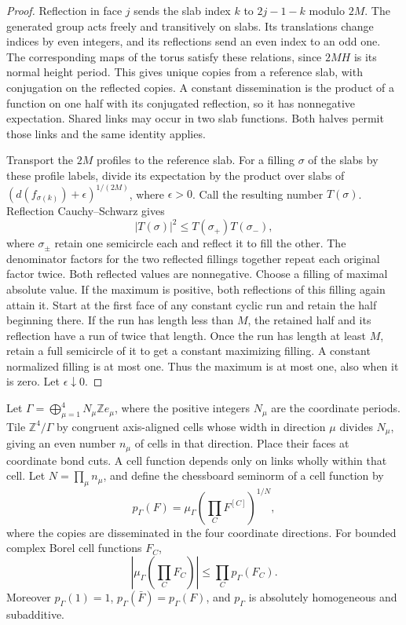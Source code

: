 \documentclass[11pt,letterpaper,reqno]{amsart}
\makeatletter
\numberwithin{equation}{section}
\theoremstyle{definition}
\newcommand{\ms@majorstart}{%
  \pushQED{\qed}\renewcommand{\qedsymbol}{$\blacksquare\square$}}
\newenvironment{corollary}[1][]{\ms@majorstart\ms@corollary[#1]}
  {\popQED\endms@corollary}
\theoremstyle{remark}
\makeatother
\begin{document}
\begin{proof}
Reflection in face \(j\) sends the slab index \(k\) to
\(2j-1-k\) modulo \(2M\). The generated group acts freely and
transitively on slabs. Its translations change indices by even
integers, and its reflections send an even index to an odd one. The corresponding
maps of the torus satisfy these relations, since \(2MH\) is its
normal height period. This gives unique copies from a reference
slab, with conjugation on the reflected copies. A constant
dissemination is the product of a function on one half with
its conjugated reflection, so it has nonnegative expectation.
Shared links may occur in two slab functions. Both halves permit
those links and the same identity applies.

Transport the \(2M\) profiles to the reference slab. For a filling
\(\sigma\) of the slabs by these profile labels, divide its expectation
by the product over slabs of \((d(f_{\sigma(k)})+\epsilon)^{1/(2M)}\),
where \(\epsilon>0\). Call the resulting number \(T(\sigma)\).
Reflection Cauchy--Schwarz gives
\[
     |T(\sigma)|^2\le T(\sigma_+)T(\sigma_-),
\]
where \(\sigma_\pm\) retain one semicircle each and reflect it
to fill the other. The denominator factors for the two
reflected fillings together repeat each original factor twice.
Both reflected values are nonnegative.
Choose a filling of maximal absolute value. If the maximum is
positive, both reflections of this filling again attain it.
Start at the first face of any constant cyclic run and retain
the half beginning there. If the run has length less than \(M\),
the retained half and its reflection have a run of twice that
length. Once the run has length at least \(M\), retain a full
semicircle of it to get a constant maximizing filling. A
constant normalized filling is at most one. Thus the maximum
is at most one, also when it is zero. Let \(\epsilon\downarrow0\).
\end{proof}

\begin{corollary}[Cubic chessboards]\label{cor:lp-board-chessboard}
Let \(\Gamma=\bigoplus_{\mu=1}^4N_\mu\mathbb Z e_\mu\), where
the positive integers \(N_\mu\) are the coordinate periods. Tile
\(\mathbb Z^4/\Gamma\) by congruent axis-aligned cells whose width
in direction \(\mu\) divides \(N_\mu\), giving an even number
\(n_\mu\) of cells in that direction. Place their faces at
coordinate bond cuts. A cell function depends only on links wholly within that cell.
Let \(N=\prod_\mu n_\mu\), and define the chessboard seminorm of
a cell function by
\[
 p_\Gamma(F)=\mu_\Gamma\!\left(\prod_C F^{[C]}\right)^{1/N},
\]
where the copies are disseminated in the four coordinate directions.
For bounded complex Borel cell functions \(F_C\),
\begin{equation}\label{eq:lp-board}
 \left|\mu_\Gamma\left(\prod_C F_C\right)\right|
        \le\prod_Cp_\Gamma(F_C).
\end{equation}
Moreover \(p_\Gamma(1)=1\), \(p_\Gamma(\bar F)=p_\Gamma(F)\),
and \(p_\Gamma\) is absolutely homogeneous and subadditive.
\end{corollary}
\end{document}
